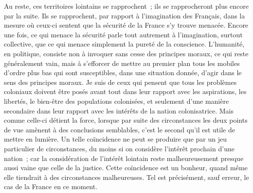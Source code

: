 \documentclass[french,twoside]{book} %
\begin{document}
Au reste, ces territoires lointains se rapprochent ; ils se rapprocheront plus encore par la suite. Ils se rapprochent, par rapport à l'imagination des Français, dans la mesure où ceux-ci sentent que la sécurité de la France s'y trouve menacée. Encore une fois, ce qui menace la sécurité parle tout autrement à l'imagination, surtout collective, que ce qui menace simplement la pureté de la conscience. L'humanité, en politique, consiste non à invoquer sans cesse des principes moraux, ce qui reste généralement vain, mais à s'efforcer de mettre au premier plan tous les mobiles d'ordre plus bas qui sont susceptibles, dans une situation donnée, d'agir dans le sens des principes moraux. Je suis de ceux qui pensent que tous les problèmes coloniaux doivent être posés avant tout dans leur rapport avec les aspirations, les libertés, le bien-être des populations colonisées, et seulement d'une manière secondaire dans leur rapport avec les intérêts de la nation colonisatrice. Mais comme celle-ci détient la force, lorsque par suite des circonstances les deux points de vue amènent à des conclusions semblables, c'est le second qu'il est utile de mettre en lumière. Un telle coïncidence ne peut se produire que par un jeu particulier de circonstan­ces, du moins si on considère l'intérêt prochain d'une nation ; car la considération de l'intérêt lointain reste malheureusement presque aussi vaine que celle de la justice. Cette coïncidence est un bonheur, quand même elle tiendrait à des circonstances malheureuses. Tel est précisément, sauf erreur, le cas de la France en ce moment.\par
\end{document}
